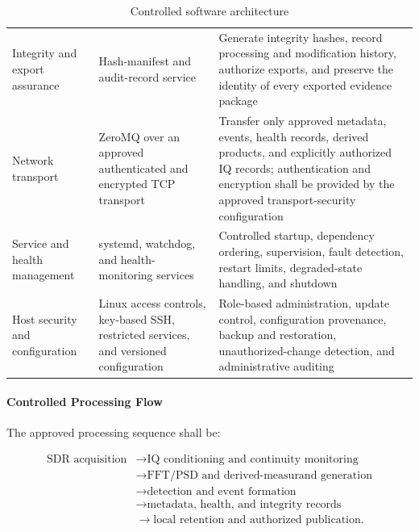 \documentclass[11pt,a4paper]{article}
\begin{document}
\begin{table}[htbp]
\begin{tabularx}{\columnwidth}{
				>{\raggedright\arraybackslash}p{2.7cm}
				>{\raggedright\arraybackslash}p{3.8cm}
				>{\raggedright\arraybackslash}X}
			Integrity and export assurance &
			Hash-manifest and audit-record service &
			Generate integrity hashes, record processing and modification history,
			authorize exports, and preserve the identity of every exported
			evidence package \\
			
			Network transport &
			ZeroMQ over an approved authenticated and encrypted TCP transport &
			Transfer only approved metadata, events, health records, derived
			products, and explicitly authorized IQ records; authentication and
			encryption shall be provided by the approved transport-security
			configuration \\
			
			Service and health management &
			systemd, watchdog, and health-monitoring services &
			Controlled startup, dependency ordering, supervision, fault
			detection, restart limits, degraded-state handling, and shutdown \\
			
			Host security and configuration &
			Linux access controls, key-based SSH, restricted services, and
			versioned configuration &
			Role-based administration, update control, configuration provenance,
			backup and restoration, unauthorized-change detection, and
			administrative auditing \\
			
			\bottomrule
		\end{tabularx}
		\caption{Controlled software architecture}
		\label{tab:software}
		
	\end{table}
	
	\paragraph*{Controlled Processing Flow}
	
	The approved processing sequence shall be:
	
	\[
	\begin{aligned}
		\text{SDR acquisition}
		&\rightarrow
		\text{IQ conditioning and continuity monitoring} \\
		&\rightarrow
		\text{FFT/PSD and derived-measurand generation} \\
		&\rightarrow
		\text{detection and event formation} \\
		&\rightarrow
		\text{metadata, health, and integrity records} \\
		&\rightarrow
		\text{local retention and authorized publication}.
	\end{aligned}
	\]
	
\end{document}
